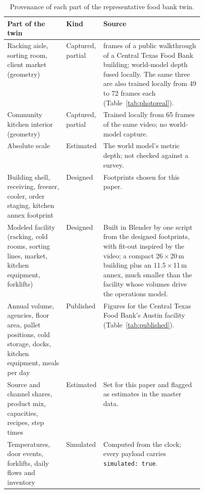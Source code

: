 \documentclass{article}
\newcommand{\code}[1]{\texttt{\small #1}}
\begin{document}
\begin{table}[t]
\caption{Provenance of each part of the representative food bank twin.}
\centering\small
\begin{tabularx}{\linewidth}{@{}>{\raggedright\arraybackslash}p{0.3\linewidth}>{\raggedright\arraybackslash}p{0.17\linewidth}>{\raggedright\arraybackslash}X@{}}
\toprule
Part of the twin & Kind & Source \\
\midrule
Racking aisle, sorting room, client market (geometry) & Captured, partial & 20 frames of a public walkthrough of a Central Texas Food Bank building; world-model depth fused locally. The same three are also trained locally from 49 to 72 frames each (Table~\ref{tab:photoreal}). \\
Community kitchen interior (geometry) & Captured, partial & Trained locally from 65 frames of the same video; no world-model capture. \\
Absolute scale & Estimated & The world model's metric depth; not checked against a survey. \\
Building shell, receiving, freezer, cooler, order staging, kitchen annex footprint & Designed & Footprints chosen for this paper. \\
Modeled facility (racking, cold rooms, sorting lines, market, kitchen equipment, forklifts) & Designed & Built in Blender by one script from the designed footprints, with fit-out inspired by the video; a compact 26\,$\times$\,20\,m building plus an 11.5\,$\times$\,11\,m annex, much smaller than the facility whose volumes drive the operations model. \\
Annual volume, agencies, floor area, pallet positions, cold storage, docks, kitchen equipment, meals per day & Published & Figures for the Central Texas Food Bank's Austin facility (Table~\ref{tab:published}). \\
Source and channel shares, product mix, capacities, recipes, step times & Estimated & Set for this paper and flagged as estimates in the master data. \\
Temperatures, door events, forklifts, daily flows and inventory & Simulated & Computed from the clock; every payload carries \code{simulated: true}. \\
\bottomrule
\end{tabularx}
\label{tab:provenance}
\end{table}
\end{document}
